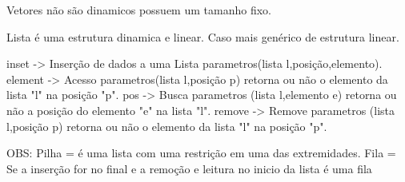 Vetores não são dinamicos possuem um tamanho fixo.

Lista é uma estrutura dinamica e linear.
Caso mais genérico de estrutura linear.

inset -> Inserção de dados a uma Lista parametros(lista l,posição,elemento).
element -> Acesso parametros(lista l,posição p) retorna ou não o elemento da lista "l" na posição "p".
pos -> Busca parametros (lista l,elemento e) retorna ou não a posição do elemento "e" na lista "l".
remove -> Remove parametros (lista l,posição p) retorna ou não o elemento da lista "l" na posição "p".

OBS: {Pilha =  é uma lista com uma restrição em uma das extremidades.
Fila = Se a inserção for no final e a remoção e leitura no inicio da lista é uma fila}